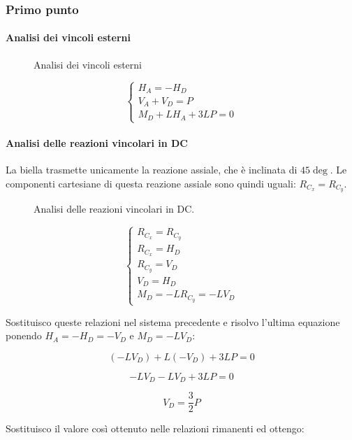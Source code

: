 \documentclass[main.tex]{subfiles}
\begin{document}
\subsubsection{Primo punto}

\paragraph{Analisi dei vincoli esterni}

\begin{figure}[H]
\centering
\resizebox{.5\textwidth}{!}{}
\caption{Analisi dei vincoli esterni}
\end{figure}

\[
\begin{cases}
	H_A = - H_D\\
	V_A + V_D = P\\
	M_D + LH_A + 3LP = 0
\end{cases}
\]

\paragraph{Analisi delle reazioni vincolari in DC}
La biella trasmette unicamente la reazione assiale, che è inclinata di $45\deg$. Le componenti cartesiane di questa reazione assiale sono quindi uguali: $R_{C_x} = R_{C_y}$.

\begin{figure}[H]
\centering
\resizebox{.5\textwidth}{!}{}
\caption{Analisi delle reazioni vincolari in DC.}
\end{figure}

\[
\begin{cases}
	R_{C_x} = R_{C_y}\\
	R_{C_x} = H_D\\
	R_{C_y} = V_D\\
	V_D = H_D\\
	M_D = -LR_{C_y} = -LV_D
\end{cases}
\]

Sostituisco queste relazioni nel sistema precedente e risolvo l'ultima equazione ponendo $H_A = -H_D = -V_D$ e $M_D = -LV_D$:

\[
	(-LV_D) + L(-V_D) + 3LP = 0
\]

\[
	-LV_D - LV_D + 3LP = 0
\]

\[
	V_D = \dfrac{3}{2}P
\]

Sostituisco il valore così ottenuto nelle relazioni rimanenti ed ottengo:
\end{document}
